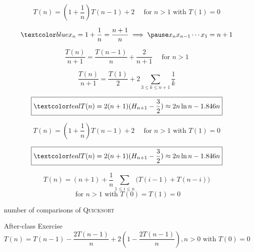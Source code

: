 \begin{frame}{}
  \[
    \boxed{T(n) = (1 + \frac{1}{n}) T(n-1) + 2  \quad \text{ for } n > 1 \text{ with } T(1) = 0}
  \]

  \pause
  \[
    \blue{x_n = 1 + \frac{1}{n} = \frac{n+1}{n}} \implies \pause x_n x_{n-1} \cdots x_1 = n + 1
  \]

  \pause
  \[
    \frac{T(n)}{n+1} = \frac{T(n-1)}{n} + \frac{2}{n+1} \quad \text{ for } n > 1
  \]

  \pause
  \vspace{0.30cm}
  \[
    \frac{T(n)}{n+1} = \frac{T(1)}{2} + 2 \sum_{3 \le k \le n+1} \frac{1}{k}
  \]

  \pause
  \vspace{0.30cm}
  \[
    \boxed{\teal{T(n) = 2(n+1) (H_{n+1} - \frac{3}{2})} \approx 2n \ln n - 1.846n}
  \]
\end{frame}

\begin{frame}{}
  \[
    \boxed{T(n) = (1 + \frac{1}{n}) T(n-1) + 2  \quad \text{ for } n > 1 \text{ with } T(1) = 0}
  \]

  \[
    \boxed{\teal{T(n) = 2(n+1) (H_{n+1} - \frac{3}{2})} \approx 2n \ln n - 1.846n}
  \]

  \pause
  \vspace{0.50cm}
  \[
    T(n) = (n + 1) + \frac{1}{n} \sum_{1 \le i \le n} \Big(T(i-1) + T(n-i) \Big)
  \]
  \[
    \text{ for } n > 1 \text{ with } T(0) = T(1) = 0
  \]

  \vspace{0.30cm}
  \begin{center}
     number of comparisons of \textsc{Quicksort}
  \end{center}
\end{frame}

\begin{frame}{}
  \begin{exampleblock}{After-class Exercise}
    \[
      T(n) = T(n-1) - \frac{2T(n-1)}{n} + 2\left(1 - \frac{2T(n-1)}{n}\right), 
      n > 0 \text{ with } T(0) = 0
    \]
  \end{exampleblock}

  \vspace{0.30cm}
  \begin{center}
    \href{https://github.com/hengxin/problem-solving-class-paperswelove/blob/master/2nd-semester/Acta\%20Informatica\%20(Yao\%201978)\%20On\%20Random\%202-3\%20Trees.pdf}{}
  \end{center}

  \pause
\end{frame}

